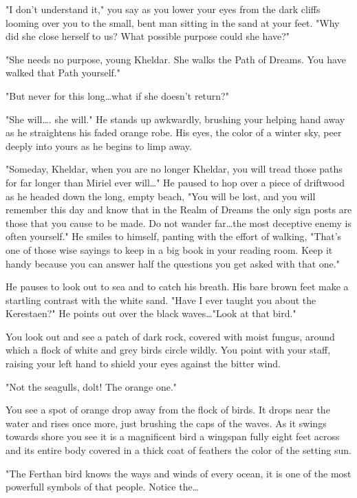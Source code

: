{{"I don't understand it," you say as you lower your eyes from the dark 
cliffs looming over you to the small, bent man sitting in the sand at 
your feet. "Why did she close herself to us? What possible purpose could 
she have?"

"She needs no purpose, young Kheldar. She walks the Path of Dreams. You 
have walked that Path yourself."

"But never for this long\dots what if she doesn't return?"

"She will\dots. she will."  He stands up awkwardly, brushing your 
helping hand away as he straightens his faded orange robe. His eyes, the 
color of a winter sky, peer deeply into yours as he begins to limp away.

"Someday, Kheldar, when you are no longer Kheldar, you will tread those 
paths for far longer than Miriel ever will\dots" He paused to hop over a 
piece of driftwood as he headed down the long, empty beach, "You will be 
lost, and you will remember this day and know that in the Realm of 
Dreams the only sign posts are those that you cause to be made. Do not 
wander far\dots the most deceptive enemy is often yourself." He smiles 
to himself, panting with the effort of walking, "That's one of those 
wise sayings to keep in a big book in your reading room. Keep it handy 
because you can answer half the questions you get asked with that one."

He pauses to look out to sea and to catch his breath. His bare brown 
feet make a startling contrast with the white sand. "Have I ever taught 
you about the Kerestaen?" He points out over the black waves\dots "Look 
at that bird."

You look out and see a patch of dark rock, covered with moist fungus, 
around which a flock of white and grey birds circle wildly. You point 
with your staff, raising your left hand to shield your eyes against the 
bitter wind.

"Not the seagulls, dolt! The orange one."

You see a spot of orange drop away from the flock of birds. It drops 
near the water and rises once more, just brushing the caps of the waves. 
As it swings towards shore you see it is a magnificent bird\- a wingspan 
fully eight feet across and its entire body covered in a thick coat of 
feathers the color of the setting sun.

"The Ferthan bird knows the ways and winds of every ocean, it is one of 
the most powerfull symbols of that people. Notice the\dots

}}
